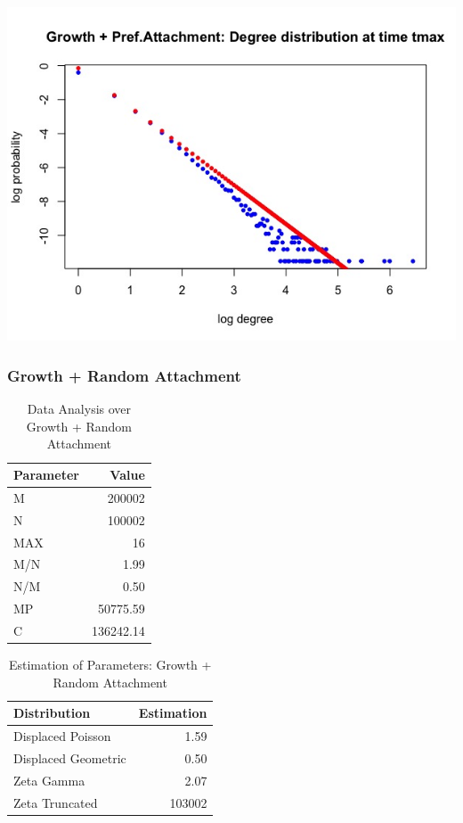 \documentclass[12pt, a4paper]{article}
\begin{document}
\begin{minipage}[t]{\linewidth}
    \includegraphics[width=\textwidth]{degree_tmax_grow_pref_att}
    \captionsetup{type=figure}
    \label{fig:degree_tmax_grow_pref_att}
  \end{minipage}

\subsubsection{Growth + Random Attachment}

\begin{table}[H]
    \centering
    \begin{tabular}{l r}
        Parameter & Value\\
        \hline              
        M & 200002\\
        N & 100002\\
        MAX & 16\\
        M/N & 1.99\\
        N/M & 0.50\\
        MP & 50775.59\\
        C & 136242.14
    \end{tabular}
    \caption{Data Analysis over Growth + Random Attachment}
    \label{table:grow_ran_att_1}
\end{table}

\begin{table}[H]
    \centering
    \begin{tabular}{l r}
        Distribution & Estimation\\
        \hline
        Displaced Poisson & 1.59\\
        Displaced Geometric & 0.50\\
        Zeta Gamma & 2.07\\ 
        Zeta Truncated & 103002\\
    \end{tabular}
    \caption{Estimation of Parameters: Growth + Random Attachment}
    \label{table:grow_ran_att_2}
\end{table}
\end{document}
